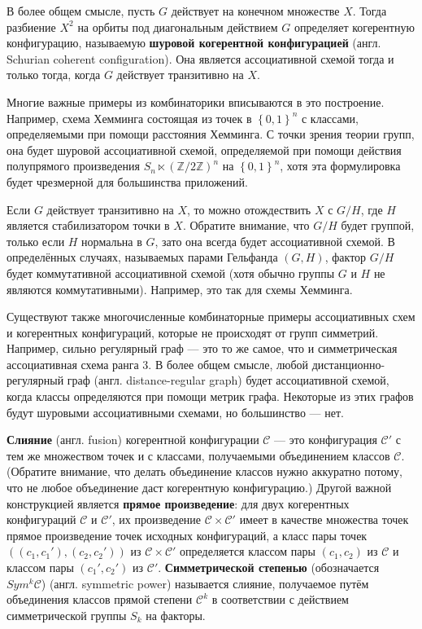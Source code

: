 В более общем смысле, пусть $G$ действует на конечном множестве $X$. Тогда разбиение $X^2$ на орбиты под диагональным действием $G$ определяет когерентную конфигурацию, называемую \textbf{шуровой когерентной конфигурацией} (англ. Schurian coherent configuration). Она является ассоциативной схемой тогда и только тогда, когда $G$ действует транзитивно на $X$.

Многие важные примеры из комбинаторики вписываются в это построение. Например, схема Хемминга состоящая из точек в $\left\{ 0,1 \right\}^n$ с классами, определяемыми при помощи расстояния Хемминга. С точки зрения теории групп, она будет шуровой ассоциативной схемой, определяемой при помощи действия полупрямого произведения $S_n \ltimes (\mathbb{Z}/2 \mathbb{Z})^n$ на $\left\{ 0,1 \right\}^n$, хотя эта формулировка будет чрезмерной для большинства приложений.

Если $G$ действует транзитивно на $X$, то можно отождествить $X$ с $G/H$, где $H$ является стабилизатором точки в $X$. Обратите внимание, что $G/H$ будет группой, только если $H$ нормальна в $G$, зато она всегда будет ассоциативной схемой. В определённых случаях, называемых парами Гельфанда $(G,H)$, фактор $G/H$ будет коммутативной ассоциативной схемой (хотя обычно группы $G$ и $H$ не являются коммутативными). Например, это так для схемы Хемминга.

Существуют также многочисленные комбинаторные примеры ассоциативных схем и когерентных конфигураций, которые не происходят от групп симметрий. Например, сильно регулярный граф --- это то же самое, что и симметрическая ассоциативная схема ранга 3. В более общем смысле, любой дистанционно-регулярный граф (англ. distance-regular graph) будет ассоциативной схемой, когда классы определяются при помощи метрик графа. Некоторые из этих графов будут шуровыми ассоциативными схемами, но большинство --- нет. 

\textbf{Слияние} (англ. fusion) когерентной конфигурации $\mathscr{C}$ --- это конфигурация $\mathscr{C}'$ с тем же множеством точек и с классами, получаемыми объединением классов $\mathscr{C}$. (Обратите внимание, что делать объединение классов нужно аккуратно потому, что не любое объединение даст когерентную конфигурацию.) Другой важной конструкцией является \textbf{прямое произведение}: для двух когерентных конфигураций $\mathscr{C}$ и $\mathscr{C}'$, их произведение $\mathscr{C} \times \mathscr{C}'$ имеет в качестве множества точек прямое произведение точек исходных конфигураций, а класс пары точек $((c_1,c_1'),(c_2,c_2'))$ из $\mathscr{C} \times \mathscr{C}'$ определяется классом пары $(c_1,c_2)$ из $\mathscr{C}$ и классом пары $(c_1',c_2')$ из $\mathscr{C}'$. \textbf{Симметрической степенью} (обозначается $Sym^k \mathscr{C}$) (англ. symmetric power) называется слияние, получаемое путём объединения классов прямой степени $\mathscr{C}^k$ в соответствии с действием симметрической группы $S_k$ на факторы.

